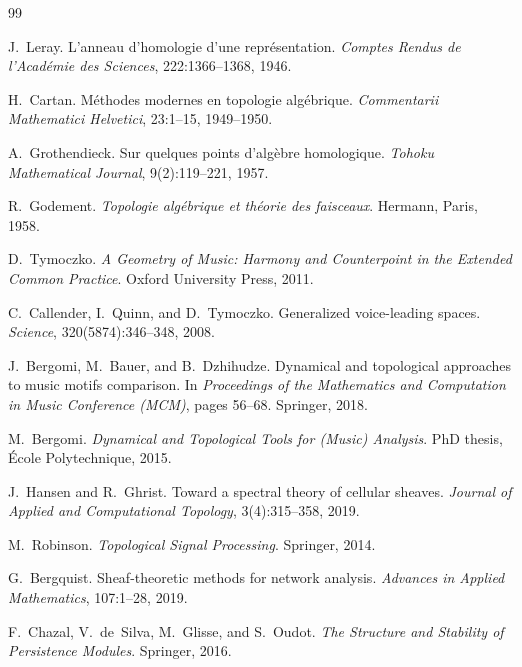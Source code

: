 \documentclass[12pt,a4paper]{article}
\begin{document}

\begin{thebibliography}{99}

J.~Leray.
\newblock L'anneau d'homologie d'une repr\'esentation.
\newblock \emph{Comptes Rendus de l'Acad\'emie des Sciences}, 222:1366--1368, 1946.

H.~Cartan.
\newblock M\'ethodes modernes en topologie alg\'ebrique.
\newblock \emph{Commentarii Mathematici Helvetici}, 23:1--15, 1949--1950.

A.~Grothendieck.
\newblock Sur quelques points d'alg\`ebre homologique.
\newblock \emph{Tohoku Mathematical Journal}, 9(2):119--221, 1957.

R.~Godement.
\newblock \emph{Topologie alg\'ebrique et th\'eorie des faisceaux}.
\newblock Hermann, Paris, 1958.

D.~Tymoczko.
\newblock \emph{A Geometry of Music: Harmony and Counterpoint in the Extended Common Practice}.
\newblock Oxford University Press, 2011.

C.~Callender, I.~Quinn, and D.~Tymoczko.
\newblock Generalized voice-leading spaces.
\newblock \emph{Science}, 320(5874):346--348, 2008.

J.~Bergomi, M.~Bauer, and B.~Dzhihudze.
\newblock Dynamical and topological approaches to music motifs comparison.
\newblock In \emph{Proceedings of the Mathematics and Computation in Music Conference (MCM)}, 
pages 56--68. Springer, 2018.

M.~Bergomi.
\newblock \emph{Dynamical and Topological Tools for (Music) Analysis}.
\newblock PhD thesis, \'Ecole Polytechnique, 2015.

J.~Hansen and R.~Ghrist.
\newblock Toward a spectral theory of cellular sheaves.
\newblock \emph{Journal of Applied and Computational Topology}, 3(4):315--358, 2019.

M.~Robinson.
\newblock \emph{Topological Signal Processing}.
\newblock Springer, 2014.

G.~Bergquist.
\newblock Sheaf-theoretic methods for network analysis.
\newblock \emph{Advances in Applied Mathematics}, 107:1--28, 2019.

F.~Chazal, V.~de~Silva, M.~Glisse, and S.~Oudot.
\newblock \emph{The Structure and Stability of Persistence Modules}.
\newblock Springer, 2016.


\end{thebibliography}
\end{document}
